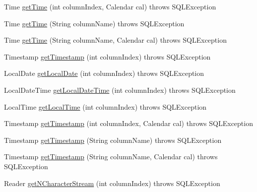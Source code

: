 \begin{DoxyCompactItemize}
\item 
Time \mbox{\hyperlink{classcom_1_1mysql_1_1cj_1_1jdbc_1_1result_1_1_result_set_impl_a72f2cba14d26d3bba4c0c7555b083275}{get\+Time}} (int column\+Index, Calendar cal)  throws S\+Q\+L\+Exception 
\item 
Time \mbox{\hyperlink{classcom_1_1mysql_1_1cj_1_1jdbc_1_1result_1_1_result_set_impl_a3f38ba7ca058ce41f888de8959e0e5aa}{get\+Time}} (String column\+Name)  throws S\+Q\+L\+Exception 
\item 
Time \mbox{\hyperlink{classcom_1_1mysql_1_1cj_1_1jdbc_1_1result_1_1_result_set_impl_a481950c62fdad863bbb0abfb2715cc29}{get\+Time}} (String column\+Name, Calendar cal)  throws S\+Q\+L\+Exception 
\item 
Timestamp \mbox{\hyperlink{classcom_1_1mysql_1_1cj_1_1jdbc_1_1result_1_1_result_set_impl_a887cf243fad3270569d937e9c96ea91f}{get\+Timestamp}} (int column\+Index)  throws S\+Q\+L\+Exception 
\item 
Local\+Date \mbox{\hyperlink{classcom_1_1mysql_1_1cj_1_1jdbc_1_1result_1_1_result_set_impl_a3f3de9c00d4b6f4c3112b70d2ef65637}{get\+Local\+Date}} (int column\+Index)  throws S\+Q\+L\+Exception 
\item 
Local\+Date\+Time \mbox{\hyperlink{classcom_1_1mysql_1_1cj_1_1jdbc_1_1result_1_1_result_set_impl_a0d1a0476e11c16e89bad7d1579180f94}{get\+Local\+Date\+Time}} (int column\+Index)  throws S\+Q\+L\+Exception 
\item 
Local\+Time \mbox{\hyperlink{classcom_1_1mysql_1_1cj_1_1jdbc_1_1result_1_1_result_set_impl_a7648426a041ffc9d73c5cfc2e2e29892}{get\+Local\+Time}} (int column\+Index)  throws S\+Q\+L\+Exception 
\item 
Timestamp \mbox{\hyperlink{classcom_1_1mysql_1_1cj_1_1jdbc_1_1result_1_1_result_set_impl_a3c1f7335703251bc3c9a29f4182927b0}{get\+Timestamp}} (int column\+Index, Calendar cal)  throws S\+Q\+L\+Exception 
\item 
Timestamp \mbox{\hyperlink{classcom_1_1mysql_1_1cj_1_1jdbc_1_1result_1_1_result_set_impl_aac901624f7fe254ca601cd7bc69f5ad2}{get\+Timestamp}} (String column\+Name)  throws S\+Q\+L\+Exception 
\item 
Timestamp \mbox{\hyperlink{classcom_1_1mysql_1_1cj_1_1jdbc_1_1result_1_1_result_set_impl_a189b75c953f07c02cbf89c81e026de87}{get\+Timestamp}} (String column\+Name, Calendar cal)  throws S\+Q\+L\+Exception 
\item 
Reader \mbox{\hyperlink{classcom_1_1mysql_1_1cj_1_1jdbc_1_1result_1_1_result_set_impl_a0eeb7429fd76f20bad6c3cbc3502b790}{get\+N\+Character\+Stream}} (int column\+Index)  throws S\+Q\+L\+Exception 

\end{DoxyCompactItemize}
